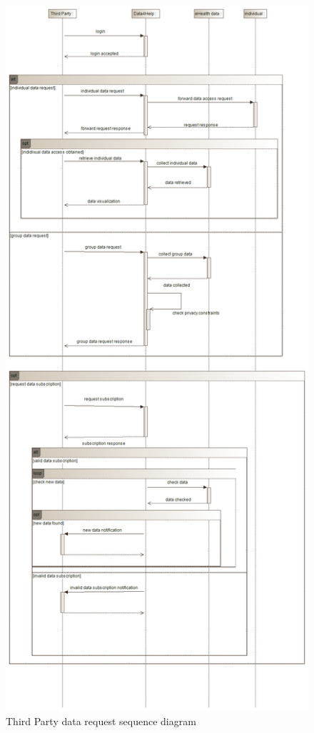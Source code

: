 \begin{figure}[H]
  \includegraphics[width=0.59\linewidth]{resources/UML/ThirdPartyDataRequest.png}
  \caption{Third Party data request sequence diagram}
  \label{fig: ThirdParty sequence diagram}
\end{figure}


